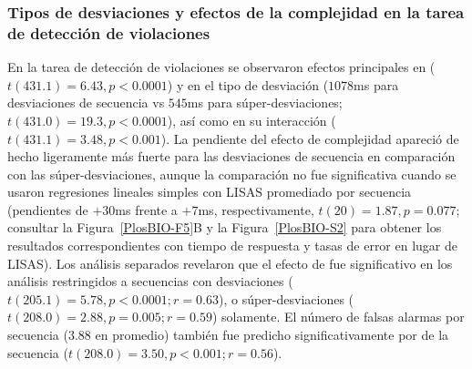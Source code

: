 \subsubsection*{Tipos de desviaciones y efectos de la complejidad en la tarea de detección de violaciones}


En la tarea de detección de violaciones se observaron efectos principales en \mdlbin ($t (431.1) = 6.43, p < 0.0001$) y en el tipo de desviación ($1078$ms para desviaciones de secuencia vs $545$ms para súper-desviaciones; $t (431.0) = 19.3, p < 0.0001$), así como en su interacción ($t (431.1) = 3.48, p < 0.001$). La pendiente del efecto de complejidad apareció de hecho ligeramente más fuerte para las desviaciones de secuencia en comparación con las súper-desviaciones, aunque la comparación no fue significativa cuando se usaron regresiones lineales simples con LISAS promediado por secuencia (pendientes de $+30$ms frente a $+7$ms, respectivamente, $t (20) = 1.87, p = 0.077$; consultar la Figura~\ref{PlosBIO-F5}B y la Figura~\ref{PlosBIO-S2} para obtener los resultados correspondientes con tiempo de respuesta y tasas de error en lugar de LISAS). Los análisis separados revelaron que el efecto de \mdlbin fue significativo en los análisis restringidos a secuencias con desviaciones ($t (205.1) = 5.78, p < 0.0001; r = 0.63$), o súper-desviaciones ($t (208.0) = 2.88, p = 0.005; r = 0.59$) solamente. El número de falsas alarmas por secuencia ($3.88$ en promedio) también fue predicho significativamente por \mdlbin de la secuencia ($t (208.0) = 3.50, p < 0.001; r = 0.56$).


